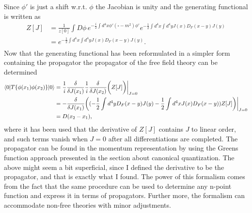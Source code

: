 Since $\phi'$ is just a shift w.r.t. $\phi$ the Jacobian is unity and the generating functional is written as
\begin{equation}
	\begin{split}
		Z[J]&=\frac{1}{z[0]}\int D\phi \, e^{-\frac{i}{2}\int d^4x\phi'(\square-m^2)\phi'}e^{-\frac{1}{2}\int d^4x\int d^4yJ(x) D_F(x-y)J(y)}\\
		&=e^{-\frac{1}{2}\int d^4x\int d^4yJ(x) D_F(x-y)J(y)}.\\
	\end{split}
\end{equation} 		
Now that the generating functional has been reformulated in a simpler form containing the propagator the propagator of the free field theory can be determined
 \begin{equation}
	\begin{split}
		\braket{0|T\{\phi(x_1)\phi(x_2)\}|0}&=\frac{1}{i}\frac{\delta }{\delta J(x_1)}\frac{1}{i}\frac{\delta }{\delta J(x_2)}\bigg(Z[J]\bigg)\bigg|_{J=0}\\
		&=-\frac{\delta}{\delta J(x_1)}\bigg((-\frac{1}{2}\int d^4yD_F(x-y)J(y)-\frac{1}{2}\int d^4x J(x)D_F(x-y))Z[J]\bigg)\bigg|_{J=0}\\
		&=D(x_2-x_1),
	\end{split}
\end{equation} 
where it has been used that the derivative of $Z[J]$ contains $J$ to linear order, and such terms vanish when $J=0$ after all differentiations are completed. The propagator can be found in the momentum representation by using the Greens function approach presented in the section about canonical quantization. The above might seem a bit superficial, since I defined the derivative to be the propagator, and that is exactly what I found. The power of this formalism comes from the fact that the same procedure can be used to determine any n-point function and express it in terms of propagators. Further more, the formalism can accommodate non-free theories with minor adjustments.

